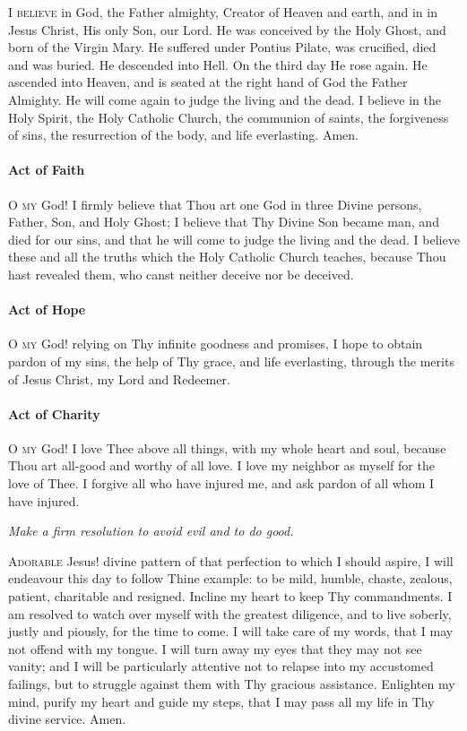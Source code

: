 \documentclass[9pt]{article}
\begin{document}
\begin{multicols}{3}
\textsc{I believe} in God, the Father almighty, Creator of Heaven and earth,
and in in Jesus Christ, His only Son, our Lord. He was conceived by
the Holy Ghost, and born of the Virgin Mary. He suffered under Pontius
Pilate, was crucified, died and was buried. He descended into Hell.
On the third day He rose again. He ascended into Heaven, and is seated
at the right hand of God the Father Almighty. He will come again to
judge the living and the dead. I believe in the Holy Spirit, the Holy
Catholic Church, the communion of saints, the forgiveness of sins, the
resurrection of the body, and life everlasting. Amen. 

\paragraph{Act of Faith}

\textsc{O my} God! I firmly believe that Thou art one God in three Divine persons,
Father, Son, and Holy Ghost; I believe that Thy Divine Son became man,
and died for our sins, and that he will come to judge the living and the
dead. I believe these and all the truths which the Holy Catholic Church
teaches, because Thou hast revealed them, who canst neither deceive nor
be deceived.

\paragraph{Act of Hope}

\textsc{O my} God! relying on Thy infinite goodness and promises, I hope to obtain
pardon of my sins, the help of Thy grace, and life everlasting, through
the merits of Jesus Christ, my Lord and Redeemer. 

\paragraph{Act of Charity}

\textsc{O my} God! I love Thee above all things, with my whole heart and soul,
because Thou art all-good and worthy of all love. I love my neighbor as
myself for the love of Thee. I forgive all who have injured me, and ask
pardon of all whom I have injured. 

\textit{Make a firm resolution to avoid evil and to do good.}

\textsc{Adorable} Jesus! divine pattern of that perfection to which I should aspire,
I will endeavour this day to follow Thine example: to be mild, humble, chaste,
zealous, patient, charitable and resigned. Incline my heart to keep Thy
commandments. I am resolved to watch over myself with the greatest diligence,
and to live soberly, justly and piously, for the time to come. I will take
care of my words, that I may not offend with my tongue. I will turn away my
eyes that they may not see vanity; and I will be particularly attentive not
to relapse into my accustomed failings, but to struggle against them with Thy
gracious assistance. Enlighten my mind, purify my heart and guide my steps,
that I may pass all my life in Thy divine service. Amen.


\end{multicols}
\end{document}
